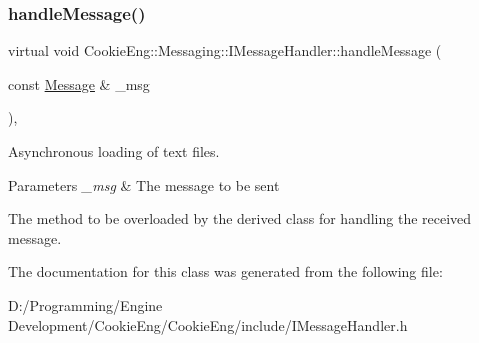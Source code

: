 \subsubsection{\texorpdfstring{handle\+Message()}{handleMessage()}}
{\footnotesize\ttfamily virtual void Cookie\+Eng\+::\+Messaging\+::\+I\+Message\+Handler\+::handle\+Message (\begin{DoxyParamCaption}\item[{const \hyperlink{class_cookie_eng_1_1_messaging_1_1_message}{Message} \&}]{\+\_\+msg }\end{DoxyParamCaption})\hspace{0.3cm}{\ttfamily [inline]}, {\ttfamily [virtual]}}



Asynchronous loading of text files. 


\begin{DoxyParams}{Parameters}
{\em \+\_\+msg} & The message to be sent\\
\hline
\end{DoxyParams}
The method to be overloaded by the derived class for handling the received message. 

The documentation for this class was generated from the following file\+:\begin{DoxyCompactItemize}
\item 
D\+:/\+Programming/\+Engine Development/\+Cookie\+Eng/\+Cookie\+Eng/include/I\+Message\+Handler.\+h\end{DoxyCompactItemize}
